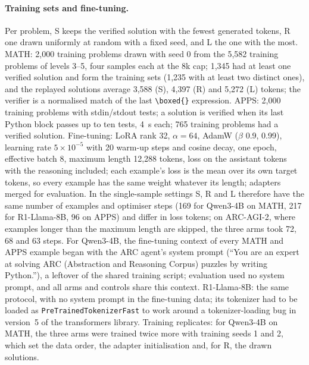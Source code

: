 \documentclass[10pt]{article}
\begin{document}
\paragraph{Training sets and fine-tuning.} Per problem, S keeps the verified solution with the fewest generated tokens, R one drawn uniformly at random with a fixed seed, and L the one with the most. MATH: 2{,}000 training problems drawn with seed 0 from the 5{,}582 training problems of levels 3--5, four samples each at the 8k cap; 1{,}345 had at least one verified solution and form the training sets (1{,}235 with at least two distinct ones), and the replayed solutions average 3{,}588 (S), 4{,}397 (R) and 5{,}272 (L) tokens; the verifier is a normalised match of the last \texttt{\textbackslash boxed\{\}} expression. APPS: 2{,}000 training problems with stdin/stdout tests; a solution is verified when its last Python block passes up to ten tests, 4~s each; 765 training problems had a verified solution. Fine-tuning: LoRA\cite{hu2022lora} rank 32, $\alpha=64$, AdamW ($\beta$ 0.9, 0.99), learning rate $5\times10^{-5}$ with 20 warm-up steps and cosine decay, one epoch, effective batch 8, maximum length 12{,}288 tokens, loss on the assistant tokens with the reasoning included; each example's loss is the mean over its own target tokens, so every example has the same weight whatever its length; adapters merged for evaluation. In the single-sample settings S, R and L therefore have the same number of examples and optimiser steps (169 for Qwen3-4B on MATH, 217 for R1-Llama-8B, 96 on APPS) and differ in loss tokens; on ARC-AGI-2, where examples longer than the maximum length are skipped, the three arms took 72, 68 and 63 steps. For Qwen3-4B, the fine-tuning context of every MATH and APPS example began with the ARC agent's system prompt (``You are an expert at solving ARC (Abstraction and Reasoning Corpus) puzzles by writing Python.''), a leftover of the shared training script; evaluation used no system prompt, and all arms and controls share this context. R1-Llama-8B: the same protocol, with no system prompt in the fine-tuning data; its tokenizer had to be loaded as \texttt{PreTrainedTokenizerFast} to work around a tokenizer-loading bug in version~5 of the transformers library. Training replicates: for Qwen3-4B on MATH, the three arms were trained twice more with training seeds 1 and 2, which set the data order, the adapter initialisation and, for R, the drawn solutions.
\end{document}
